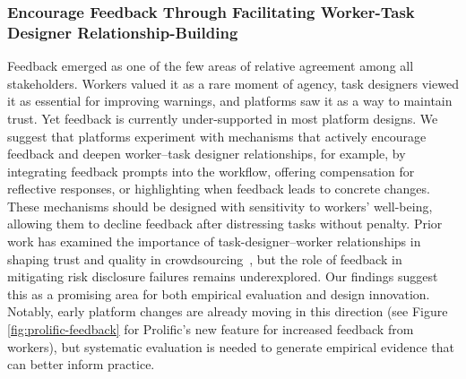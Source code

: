 \subsubsection{Encourage Feedback Through Facilitating Worker-Task Designer Relationship-Building}
Feedback emerged as one of the few areas of relative agreement among all stakeholders. Workers valued it as a rare moment of agency, task designers viewed it as essential for improving warnings, and platforms saw it as a way to maintain trust. Yet feedback is currently under-supported in most platform designs. We suggest that platforms experiment with mechanisms that actively encourage feedback and deepen worker–task designer relationships, for example, by integrating feedback prompts into the workflow, offering compensation for reflective responses, or highlighting when feedback leads to concrete changes. These mechanisms should be designed with sensitivity to workers’ well-being, allowing them to decline feedback after distressing tasks without penalty. Prior work has examined the importance of task-designer–worker relationships in shaping trust and quality in crowdsourcing~\cite{irani2013turkopticon, qian2025locating}, but the role of feedback in mitigating risk disclosure failures remains underexplored. Our findings suggest this as a promising area for both empirical evaluation and design innovation. Notably, early platform changes are already moving in this direction (see Figure \ref{fig:prolific-feedback} for Prolific's new feature for increased feedback from workers), but systematic evaluation is needed to generate empirical evidence that can better inform practice. 

